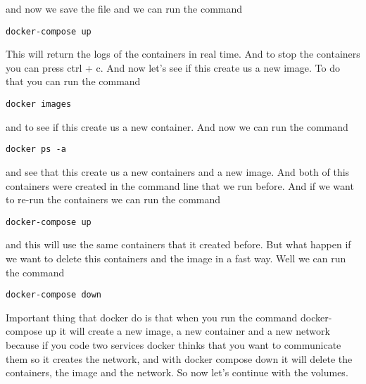 \documentclass{article}
\begin{document}
and now we save the file and we can run the command
\begin{lstlisting}[breaklines=true, breakatwhitespace=true]
    docker-compose up
\end{lstlisting}

This will return the logs of the containers in real time. And to stop the containers you can press ctrl + c. 
And now let's see if this create us a new image. To do that you can run the command 
\begin{lstlisting}[breaklines=true, breakatwhitespace=true]
    docker images
\end{lstlisting}
and to see if this create us a new container. And now we can run the command
\begin{lstlisting}[breaklines=true, breakatwhitespace=true]
    docker ps -a 
\end{lstlisting}
 
and see that this create us a new containers and a new image. And both of this containers were created 
in the command line that we run before. And if we want to re-run the containers we can run the command
\begin{lstlisting}[breaklines=true, breakatwhitespace=true]
    docker-compose up 
\end{lstlisting} 
and this will use the same containers that it created before. But what happen if we want to delete this containers and 
the image in a fast way. Well we can run the command 
\begin{lstlisting}[breaklines=true, breakatwhitespace=true]
    docker-compose down
\end{lstlisting}

Important thing that docker do is that when you run the command docker-compose up it will create a new image, a 
new container and a new network because if you code two services docker thinks that you want to communicate them so it 
creates the network, and with docker compose down it will delete the containers, the image and the network. So now let's continue 
with the volumes.
\end{document}
